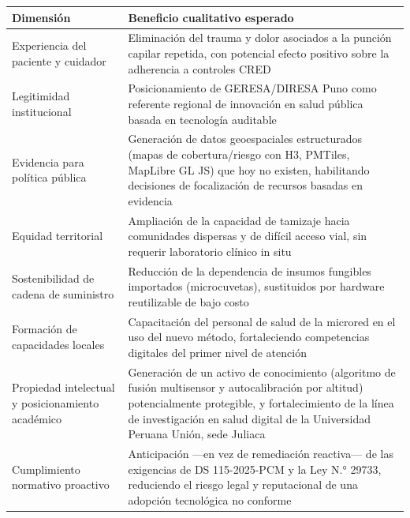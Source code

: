 \documentclass[11pt,a4paper]{article}
\begin{document}
{\small
\begin{longtable}[]{@{}
  >{\raggedright\arraybackslash}p{}
  >{\raggedright\arraybackslash}p{}@{}}
\toprule\noalign{}
\begin{minipage}[b]{\linewidth}\raggedright
Dimensión
\end{minipage} & \begin{minipage}[b]{\linewidth}\raggedright
Beneficio cualitativo esperado
\end{minipage} \\
\midrule\noalign{}
\endhead
\bottomrule\noalign{}
\endlastfoot
Experiencia del paciente y cuidador & Eliminación del trauma y dolor asociados a la punción capilar repetida, con potencial efecto positivo sobre la adherencia a controles CRED \\
Legitimidad institucional & Posicionamiento de GERESA/DIRESA Puno como referente regional de innovación en salud pública basada en tecnología auditable \\
Evidencia para política pública & Generación de datos geoespaciales estructurados (mapas de cobertura/riesgo con H3, PMTiles, MapLibre GL JS) que hoy no existen, habilitando decisiones de focalización de recursos basadas en evidencia \\
Equidad territorial & Ampliación de la capacidad de tamizaje hacia comunidades dispersas y de difícil acceso vial, sin requerir laboratorio clínico in situ \\
Sostenibilidad de cadena de suministro & Reducción de la dependencia de insumos fungibles importados (microcuvetas), sustituidos por hardware reutilizable de bajo costo \\
Formación de capacidades locales & Capacitación del personal de salud de la microred en el uso del nuevo método, fortaleciendo competencias digitales del primer nivel de atención \\
Propiedad intelectual y posicionamiento académico & Generación de un activo de conocimiento (algoritmo de fusión multisensor y autocalibración por altitud) potencialmente protegible, y fortalecimiento de la línea de investigación en salud digital de la Universidad Peruana Unión, sede Juliaca \\
Cumplimiento normativo proactivo & Anticipación ---en vez de remediación reactiva--- de las exigencias de DS 115-2025-PCM y la Ley N.° 29733, reduciendo el riesgo legal y reputacional de una adopción tecnológica no conforme \\
\end{longtable}
}
\end{document}

